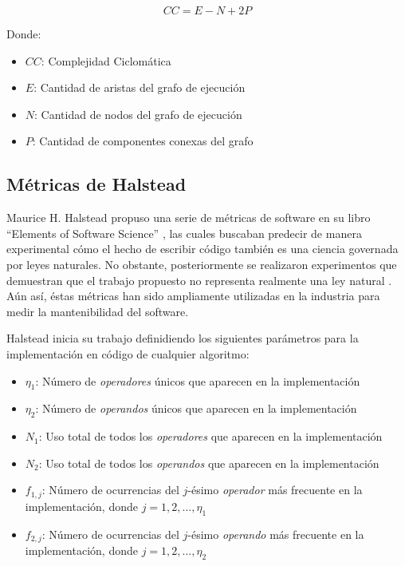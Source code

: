 \documentclass[letterpaper,12pt]{article}
\begin{document}
\begin{equation}
  CC = E - N + 2P
\end{equation}

Donde:

\begin{itemize}
  \item $CC$: Complejidad Ciclomática
  \item $E$: Cantidad de aristas del grafo de ejecución
  \item $N$: Cantidad de nodos del grafo de ejecución
  \item $P$: Cantidad de componentes conexas del grafo
\end{itemize}

\subsection{Métricas de Halstead}

Maurice H. Halstead propuso una serie de métricas de software en su libro ``Elements of Software Science'' \cite{10.5555/540137}, las cuales buscaban predecir de manera experimental cómo el hecho de escribir código también es una ciencia governada por leyes naturales. No obstante, posteriormente se realizaron experimentos que demuestran que el trabajo propuesto no representa realmente una ley natural \cite{10.5555/800254.807762}. Aún así, éstas métricas han sido ampliamente utilizadas en la industria para medir la mantenibilidad del software.

Halstead inicia su trabajo definidiendo los siguientes parámetros para la implementación en código de cualquier algoritmo:

\begin{itemize}
  \item $\eta_{1}$: Número de \textit{operadores} únicos que aparecen en la implementación
  \item $\eta_{2}$: Número de \textit{operandos} únicos que aparecen en la implementación
  \item $N_{1}$: Uso total de todos los \textit{operadores} que aparecen en la implementación
  \item $N_{2}$: Uso total de todos los \textit{operandos} que aparecen en la implementación
  \item $f_{1,j}$: Número de ocurrencias del $j$-ésimo \textit{operador} más frecuente en la implementación, donde $j = 1, 2, ..., \eta_{1}$
  \item $f_{2,j}$: Número de ocurrencias del $j$-ésimo \textit{operando} más frecuente en la implementación, donde $j = 1, 2, ..., \eta_{2}$
\end{itemize}
\end{document}
